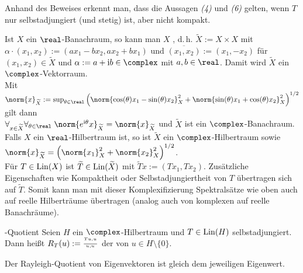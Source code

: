 \begin{Bem}
    Anhand des Beweises erkennt man, dass die Aussagen \emph{(4)} und \emph{(6)} gelten,
    wenn $T$ nur selbstadjungiert (und stetig) ist, aber nicht kompakt.
\end{Bem}

\linie

\begin{Bem}
    Ist $X$ ein $\real$-Banachraum, so kann man $X$ ,
    d.\,h. $\widetilde{X} := X \times X$ mit
    $\alpha \cdot (x_1, x_2) := (a x_1 - b x_2, a x_2 + b x_1)$ und
    $\overline{(x_1, x_2)} := (x_1, -x_2)$ für $(x_1, x_2) \in \widetilde{X}$ und
    $\alpha := a + \iu b \in \complex$ mit $a, b \in \real$.
    Damit wird $\widetilde{X}$ ein $\complex$-Vektorraum.\\
    Mit $\norm{x}_{\widetilde{X}} := \sup_{\theta \in \real}
    \left(\norm{\cos(\theta)x_1 - \sin(\theta)x_2}_X^2 +
    \norm{\sin(\theta)x_1 + \cos(\theta)x_2}_X^2\right)^{1/2}$ gilt dann\\
    $\forall_{x \in \widetilde{X}} \forall_{\theta \in \real}\;
    \norm{e^{\iu\theta}x}_{\widetilde{X}} = \norm{x}_{\widetilde{X}}$
    und $\widetilde{X}$ ist ein $\complex$-Banachraum.\\
    Falls $X$ ein $\real$-Hilbertraum ist, so ist $\widetilde{X}$ ein $\complex$-Hilbertraum
    sowie $\norm{x}_{\widetilde{X}} = \left(\norm{x_1}_X^2 + \norm{x_2}_X^2\right)^{1/2}$.\\
    Für $T \in \operatorname{Lin}(X)$ ist $\widetilde{T} \in \operatorname{Lin}(\widetilde{X})$ mit
    $\widetilde{T}x := (Tx_1, Tx_2)$.
    Zusätzliche Eigenschaften wie Kompaktheit oder Selbstadjungiertheit von $T$ übertragen sich
    auf $\widetilde{T}$.
    Somit kann man mit dieser Komplexifizierung Spektralsätze wie oben auch auf reelle
    Hilberträume übertragen (analog auch von komplexen auf reelle Banachräume).
\end{Bem}

\linie
\pagebreak

\begin{Def}{-Quotient}
    Seien $H$ ein $\complex$-Hilbertraum und $T \in \operatorname{Lin}(H)$ selbstadjungiert.\\
    Dann heißt $R_T(u) := \frac{\sp{Tu, u}}{\sp{u, u}}$
    der  von $u \in H \setminus \{0\}$.
\end{Def}

\begin{Bem}
    Der Rayleigh-Quotient von Eigenvektoren ist
    gleich dem jeweiligen Eigenwert.
\end{Bem}

